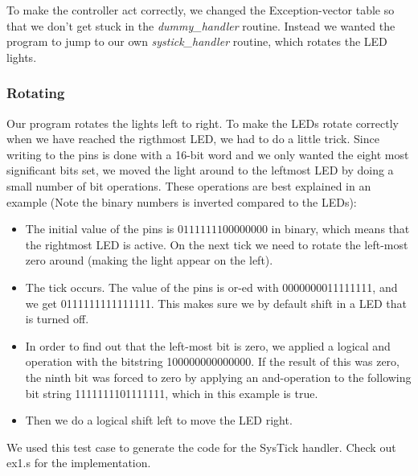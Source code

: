 To make the controller act correctly, we changed the Exception-vector table so that we don't get stuck in the \emph{dummy\_handler} routine. Instead we wanted the program to jump to our own \emph{systick\_handler} routine, which rotates the LED lights.

	\subsubsection{Rotating}
	Our program rotates the lights left to right. To make the LEDs rotate correctly when we have reached the rigthmost LED, we had to do a little trick. Since writing to the pins is done with a 16-bit word and we only wanted the eight most significant bits set, we moved the light around to the leftmost LED by doing a small number of bit operations. These operations are best explained in an example (Note the binary numbers is inverted compared to the LEDs):
	\begin{itemize}
	\item The initial value of the pins is $0111111100000000$ in binary, which means that the rightmost LED is active. On the next tick we need to rotate the left-most zero around (making the light appear on the left).
	\item The tick occurs. The value of the pins is or-ed with 0000000011111111, and we get 0111111111111111. This makes sure we by default shift in a LED that is turned off.
	\item  In order to find out that the left-most bit is zero, we applied a logical and operation with the bitstring 100000000000000. If the result of this was zero, the ninth bit was forced to zero by applying an and-operation to the following bit string 1111111101111111, which in this example is true.
	\item Then we do a logical shift left to move the LED right.
	\end{itemize}

We used this test case to generate the code for the SysTick handler. Check out ex1.s for the implementation.
